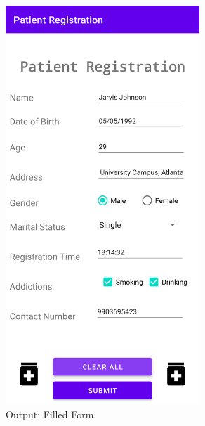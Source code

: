 \documentclass[12pt, a4]{article}
\begin{document}
\subsection*{}
\begin{figure}[h]
\centering
\caption{Output: Filled Form.}
\includegraphics[height=15cm, width=7.3cm]{PatientRegistration/Screenshots/FilledForm.png}
\end{figure}

\newpage
\end{document}

